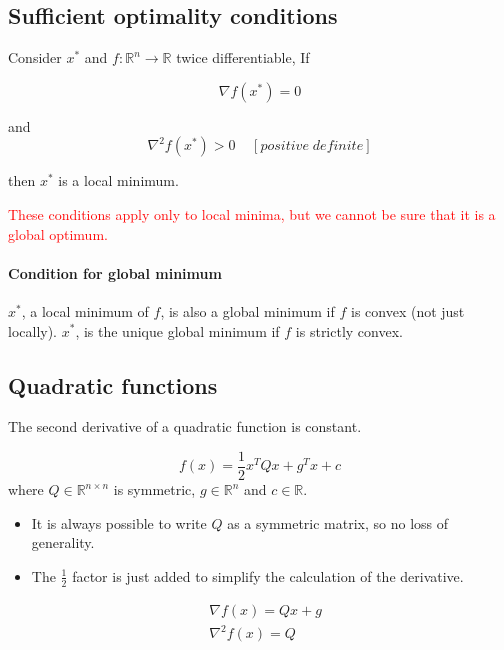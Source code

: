 \subsection{Sufficient optimality conditions}

Consider $x^*$ and $f : \mathbb{R}^n \rightarrow \mathbb{R}$ twice differentiable,
If

\begin{equation}
    \nabla f(x^*) = 0
\end{equation}

and
\begin{equation}
    \nabla^2 f(x^*) > 0 \;\;\;\;[positive\;definite]
\end{equation}

then $x^*$ is a local minimum.


\textcolor{red}{These conditions apply only to local minima, but we cannot be sure that it is a global optimum.}


\paragraph{Condition for global minimum}

$x^*$, a local minimum of $f$, is also a global minimum if $f$ is convex (not just locally).
$x^*$, is the unique global minimum if $f$ is strictly convex.


\subsection{Quadratic functions}
The second derivative of a quadratic function is constant.

\begin{equation}
    f(x) = \frac{1}{2} x^T Q x + g^Tx + c
\end{equation}
where $Q\in \mathbb{R}^{n\times n}$ is symmetric, $g\in \mathbb{R}^n$ and $c\in \mathbb{R}$.

\begin{itemize}
\item It is always possible to write $Q$ as a symmetric matrix, so no loss of generality.
\item The $\frac{1}{2}$ factor is just added to simplify the calculation of the derivative.
\end{itemize}


\begin{equation}
    \begin{split}
        &\nabla f(x) = Qx+g \\
        &\nabla^2 f(x) = Q
    \end{split}
\end{equation}

